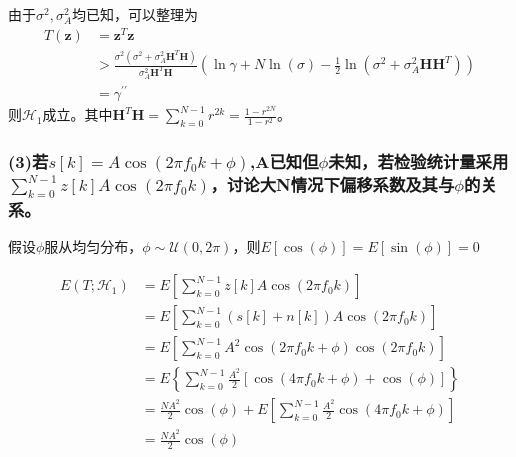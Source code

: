 \documentclass[fontset=windows]{article}
\numberwithin{figure}{section}
\begin{document}
由于\(\sigma^2,\sigma^2_A\)均已知，可以整理为
\begin{align*}
	T(\mathbf{z}) & =\mathbf{z}^T\mathbf{z}                                                                       \\
	              & >\frac{\sigma^2(\sigma^2+\sigma^2_A\mathbf{H}^T\mathbf{H})}{\sigma^2_A\mathbf{H}^T\mathbf{H}}
	(\ln \gamma+N\ln (\sigma)-\frac{1}{2}\ln(\sigma^2+\sigma^2_A\mathbf{HH}^T))                                   \\
	              & =\gamma^{\prime\prime}
\end{align*}
则\(\mathcal{H}_1\)成立。其中\(\mathbf{H}^T\mathbf{H}=\sum_{k=0}^{N-1}r^{2k}=\frac{1-r^{2N}}{1-r^2}\)。

\subsubsection*{(3)若\(s[k]=A\cos(2\pi f_0 k+\phi )\),A已知但\(\phi\)未知，若检验统计量采用\(\sum_{k=0}^{N-1}z[k]A\cos(2\pi f_0 k)\)，讨论大N情况下偏移系数及其与\(\phi\)的关系。}
假设\(\phi\)服从均匀分布，\(\phi\sim \mathcal{U}(0,2\pi)\)，则\(E\left[\cos(\phi)\right]=E\left[\sin(\phi)\right]=0\)

\begin{align*}
	E(T;\mathcal{H}_1)
	 & =E\left[\sum_{k=0}^{N-1}z[k]A\cos (2\pi f_0 k)\right]                                        \\
	 & =E\left[\sum_{k=0}^{N-1}(s[k]+n[k])A\cos (2\pi f_0 k)\right]                                 \\
	 & =E\left[\sum_{k=0}^{N-1}A^2\cos(2\pi f_0 k+\phi)\cos (2\pi f_0 k)\right]                     \\
	 & =E\left\{\sum_{k=0}^{N-1}\frac{A^2}{2}\left[\cos(4\pi f_0 k+\phi)+\cos (\phi)\right]\right\} \\
	 & =\frac{NA^2}{2}\cos(\phi)+E\left[\sum_{k=0}^{N-1}\frac{A^2}{2}\cos(4\pi f_0 k+\phi)\right]   \\
	 & =\frac{NA^2}{2}\cos(\phi)
\end{align*}
\end{document}
